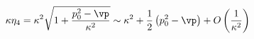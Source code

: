 \begin{equation}\label{a}
 \kappa\eta_4 = \kappa^2\sqrt{1 + \frac{p_0^2 -\vp}{\kappa^2}} \sim \kappa^2 + \frac12\left(p_0^2 -\vp\right) +
 O\left(\frac1{\kappa^2}\right)
\end{equation}


